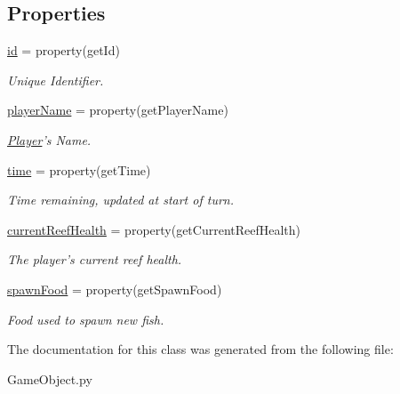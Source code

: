 \subsection*{\-Properties}
\begin{DoxyCompactItemize}
\item 
\hypertarget{classGameObject_1_1Player_a064d564c1e28e928685d44628c6e0339}{\hyperlink{classGameObject_1_1Player_a064d564c1e28e928685d44628c6e0339}{id} = property(get\-Id)}\label{classGameObject_1_1Player_a064d564c1e28e928685d44628c6e0339}

\begin{DoxyCompactList}\small\item\em \-Unique \-Identifier. \end{DoxyCompactList}\item 
\hypertarget{classGameObject_1_1Player_a8b61d81dc440d5f11b5aa96f6b215e7d}{\hyperlink{classGameObject_1_1Player_a8b61d81dc440d5f11b5aa96f6b215e7d}{player\-Name} = property(get\-Player\-Name)}\label{classGameObject_1_1Player_a8b61d81dc440d5f11b5aa96f6b215e7d}

\begin{DoxyCompactList}\small\item\em \hyperlink{classGameObject_1_1Player}{\-Player}'s \-Name. \end{DoxyCompactList}\item 
\hypertarget{classGameObject_1_1Player_afc51771700a7b6c2eb5873284c6dd193}{\hyperlink{classGameObject_1_1Player_afc51771700a7b6c2eb5873284c6dd193}{time} = property(get\-Time)}\label{classGameObject_1_1Player_afc51771700a7b6c2eb5873284c6dd193}

\begin{DoxyCompactList}\small\item\em \-Time remaining, updated at start of turn. \end{DoxyCompactList}\item 
\hypertarget{classGameObject_1_1Player_ae69252322cb52302ac11996044f65686}{\hyperlink{classGameObject_1_1Player_ae69252322cb52302ac11996044f65686}{current\-Reef\-Health} = property(get\-Current\-Reef\-Health)}\label{classGameObject_1_1Player_ae69252322cb52302ac11996044f65686}

\begin{DoxyCompactList}\small\item\em \-The player's current reef health. \end{DoxyCompactList}\item 
\hypertarget{classGameObject_1_1Player_adec5bdeaff87da6b80f49a66becc871b}{\hyperlink{classGameObject_1_1Player_adec5bdeaff87da6b80f49a66becc871b}{spawn\-Food} = property(get\-Spawn\-Food)}\label{classGameObject_1_1Player_adec5bdeaff87da6b80f49a66becc871b}

\begin{DoxyCompactList}\small\item\em \-Food used to spawn new fish. \end{DoxyCompactList}\end{DoxyCompactItemize}


\-The documentation for this class was generated from the following file\-:\begin{DoxyCompactItemize}
\item 
\-Game\-Object.\-py\end{DoxyCompactItemize}
